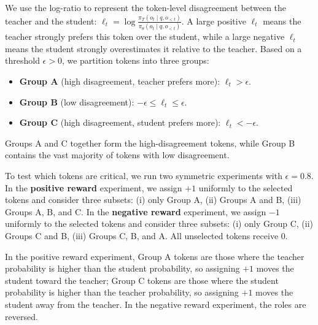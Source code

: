 \documentclass{article}
\theoremstyle{remark}
\begin{document}
We use the log-ratio to represent the token-level disagreement between the teacher and the student: $\ell_t = \log \frac{\pi_T(o_t \mid q, o_{<t})}{\pi_\theta(o_t \mid q, o_{<t})}$.
A large positive \(\ell_t\) means the teacher strongly prefers this token over the student, while a large negative \(\ell_t\) means the student strongly overestimates it relative to the teacher. Based on a threshold \(\epsilon > 0\), we partition tokens into three groups:
\begin{itemize}
    \item \textbf{Group A} (high disagreement, teacher prefers more): \(\ell_t > \epsilon\).
    \item \textbf{Group B} (low disagreement): \(-\epsilon \le \ell_t \le \epsilon\).
    \item \textbf{Group C} (high disagreement, student prefers more): \(\ell_t < -\epsilon\).
\end{itemize}
Groups A and C together form the high-disagreement tokens, while Group B contains the vast majority of tokens with low disagreement.

To test which tokens are critical, we run two symmetric experiments with \(\epsilon = 0.8\). In the \textbf{positive reward} experiment, we assign \(+1\) uniformly to the selected tokens and consider three subsets: (i) only Group A, (ii) Groups A and B, (iii) Groups A, B, and C. In the \textbf{negative reward} experiment, we assign \(-1\) uniformly to the selected tokens and consider three subsets: (i) only Group C, (ii) Groups C and B, (iii) Groups C, B, and A. All unselected tokens receive \(0\). 

In the positive reward experiment, Group A tokens are those where the teacher probability is higher than the student probability, so assigning \(+1\) moves the student toward the teacher; Group C tokens are those where the student probability is higher than the teacher probability, so assigning \(+1\) moves the student away from the teacher. In the negative reward experiment, the roles are reversed.
\end{document}
